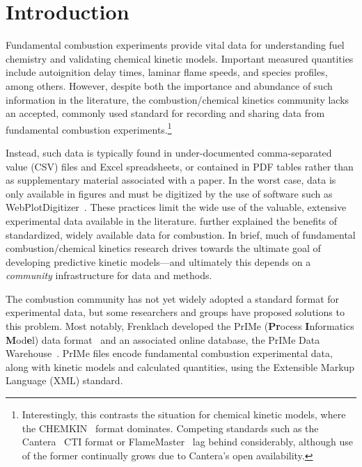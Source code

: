 \documentclass[12pt]{ussci}
\begin{document}
\section{Introduction}
%
Fundamental combustion experiments provide vital data for understanding fuel
chemistry and validating chemical kinetic models. Important measured quantities
include autoignition delay times, laminar flame speeds, and species profiles,
among others. However, despite both the importance and abundance of such
information in the literature, the combustion\slash chemical kinetics community
lacks an accepted, commonly used standard for recording and sharing data from
fundamental combustion experiments.\footnote{Interestingly, this contrasts the
situation for chemical kinetic models, where the CHEMKIN~\autocite{Kee:1996ck}
format dominates. Competing standards such as the
Cantera~\autocite{Cantera:2.3.0} CTI format or
FlameMaster~\autocite{FlameMaster:ref,FlameMaster:code} lag behind considerably,
although use of the former continually grows due to Cantera's open availability.
}

Instead, such data is typically found in under-documented comma-separated value
(CSV) files and Excel spreadsheets, or contained in PDF tables rather than as
supplementary material associated with a paper. In the worst case, data is only
available in figures and must be digitized by the use of software such as
WebPlotDigitizer~\autocite{WebPlotDigitizer}. These practices limit the wide use
of the valuable, extensive experimental data available in the literature.
\textcite{Frenklach:2007bm} further explained the benefits of standardized,
widely available data for combustion. In brief, much of fundamental
combustion\slash chemical kinetics research drives towards the ultimate goal of
developing predictive kinetic models---and ultimately this depends on a
\emph{community} infrastructure for data and methods.

The combustion community has not yet widely adopted a standard format for
experimental data, but some researchers and groups have proposed solutions to
this problem. Most notably, Frenklach developed the PrIMe (\textbf{Pr}ocess
\textbf{I}nformatics \textbf{M}od\textbf{e}l) data
format~\autocite{Frenklach:2007bm,You:2011hy} and an associated online database,
the PrIMe Data Warehouse~\autocite{PrIMe}. PrIMe files encode fundamental
combustion experimental data, along with kinetic models and calculated
quantities, using the Extensible Markup Language (XML) standard.
\end{document}
